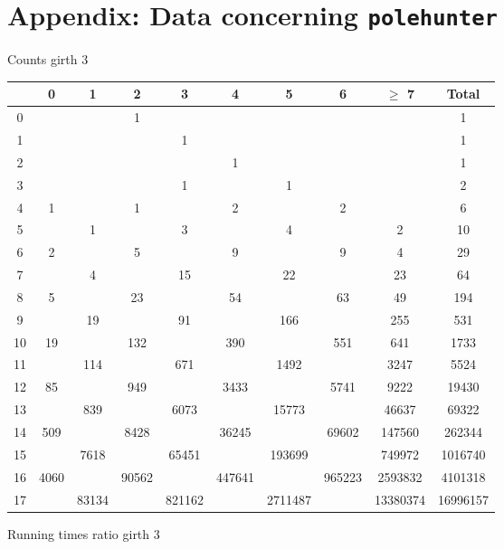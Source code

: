\chapter*{Appendix: Data concerning \texttt{polehunter}} %

\noindent Counts girth $3$

\noindent\begin{tabular}{|c|c|c|c|c|c|c|c|c|c|}
    \hline
    & 0 & 1 & 2 & 3 & 4 & 5 & 6 & $\geq$ 7 & Total\\ \hline
    0 & & & 1 & & & & & & 1 \\ \hline
    1 & & & & 1 & & & & & 1 \\ \hline    
    2 & & & & & 1 & & & & 1 \\ \hline
    3 & & & & 1 & & 1 & & & 2 \\ \hline
    4 & 1 & & 1 & & 2 & & 2 & & 6 \\ \hline
    5 & & 1 & & 3 & & 4 & & 2 & 10 \\ \hline
    6 & 2 & & 5 & & 9 & & 9 & 4 & 29 \\ \hline
    7 & & 4 & & 15 & & 22 & & 23 & 64 \\ \hline
    8 & 5 & & 23 & & 54 & & 63 & 49 & 194\\ \hline
    9 & & 19 & & 91 & & 166 & & 255 & 531\\ \hline
    10 & 19 & & 132 & & 390 & & 551 & 641 & 1733\\ \hline
    11 & & 114 & & 671 & & 1492 & & 3247 & 5524\\ \hline
    12 & 85 & & 949 & & 3433 & & 5741 & 9222 & 19430 \\ \hline
    13 & & 839 & & 6073 & & 15773 & & 46637 & 69322\\ \hline
    14 & 509 & & 8428 & & 36245 & & 69602 & 147560 & 262344\\ \hline
    15 & & 7618 & & 65451 & & 193699 & & 749972 & 1016740\\ \hline
    16 & 4060 & & 90562 & & 447641 & & 965223 & 2593832 & 4101318 \\ \hline
    17 & & 83134 & & 821162 & & 2711487 & & 13380374 & 16996157\\ \hline
\end{tabular}

\noindent Running times ratio girth $3$

